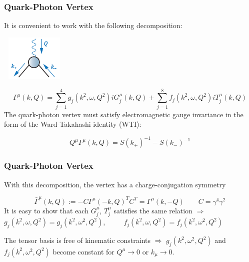 \begin{frame}\frametitle{Quark-Photon Vertex}
\begin{minipage}[r]{0.65\textwidth}
	It is convenient to work with the following decomposition:
\end{minipage}
\begin{minipage}[r]{0.30\textwidth}
	\hspace{2mm}	
	\includegraphics[height=2.2cm, width=3.2cm]{Vertex.png}
\end{minipage}


\begin{equation}
	\Gamma^\mu(k,Q)=\sum_{j=1}^4 g_j(k^2, \omega, Q^2)iG^\mu_j(k, Q)+\sum_{j=1}^8 f_j(k^2, \omega, Q^2)iT^\mu_j(k, Q)
\end{equation}
The quark-photon vertex must satisfy electromagnetic gauge invariance in the form of the
Ward-Takahashi identity (WTI):

\begin{equation}
	Q^\mu\Gamma^\mu(k, Q)=S(k_+)^{-1}-S(k_-)^{-1}
\end{equation}

\end{frame}

\begin{frame}\frametitle{Quark-Photon Vertex}
With this decomposition, the vertex has a charge-conjugation symmetry

\begin{equation}
	\bar{\Gamma}^\mu(k,Q):=-C\Gamma^\mu(-k,Q)^TC^T=\Gamma^\mu(k, -Q) \qquad C=\gamma^4\gamma^2
\end{equation}
\vspace{4mm}
It is easy to show that each $G_j^\mu$, $T_j^\mu$
satisfies the same relation $\Rightarrow$\\ \vspace{3mm} $g_j(k^2, \omega, Q^2)=g_j(k^2, \omega^2, Q^2)$, $\qquad$ $f_j(k^2, \omega, Q^2)=f_j(k^2, \omega^2, Q^2)$\\

\vspace{9mm}

The tensor basis  is free of kinematic constraints $\Rightarrow$ 
\vspace{2mm}
$g_j(k^2, \omega^2,Q^2)$ and $f_j(k^2, \omega^2,Q^2)$ become constant for $Q^\mu\to0$ or $k_\mu\to  0$.

\end{frame}


\endinput
